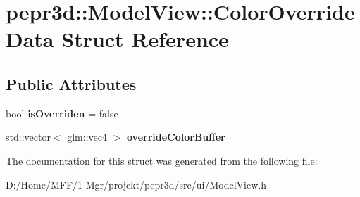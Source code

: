 \hypertarget{structpepr3d_1_1_model_view_1_1_color_override_data}{}\section{pepr3d\+::Model\+View\+::Color\+Override\+Data Struct Reference}
\label{structpepr3d_1_1_model_view_1_1_color_override_data}
\subsection*{Public Attributes}
\begin{DoxyCompactItemize}
\item 
\mbox{\label{structpepr3d_1_1_model_view_1_1_color_override_data_acd16700b474da68f77e3cd7c83e56825}} 
bool {\bfseries is\+Overriden} = false
\item 
\mbox{\label{structpepr3d_1_1_model_view_1_1_color_override_data_ab739631598ed2e9a617114adb455630b}} 
std\+::vector$<$ glm\+::vec4 $>$ {\bfseries override\+Color\+Buffer}
\end{DoxyCompactItemize}


The documentation for this struct was generated from the following file\+:\begin{DoxyCompactItemize}
\item 
D\+:/\+Home/\+M\+F\+F/1-\/\+Mgr/projekt/pepr3d/src/ui/Model\+View.\+h\end{DoxyCompactItemize}
